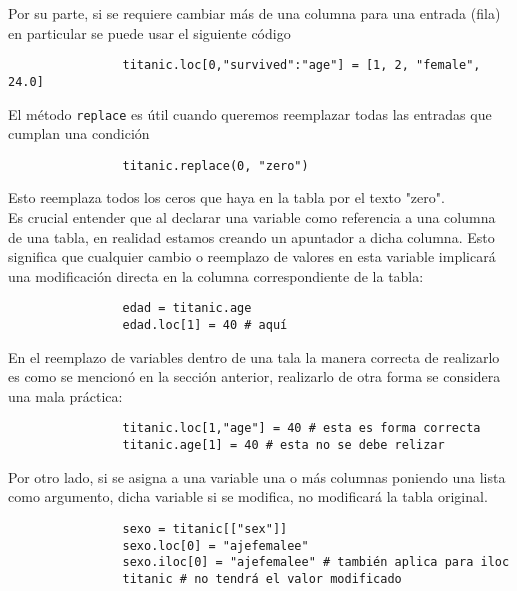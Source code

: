             \noindent Por su parte, si se requiere cambiar más de una columna para una entrada (fila) en particular se puede usar el siguiente código

            \begin{verbatim}
                titanic.loc[0,"survived":"age"] = [1, 2, "female", 24.0]
            \end{verbatim}

            \noindent El método \texttt{replace} es útil cuando queremos reemplazar todas las entradas que cumplan una condición

            \begin{verbatim}
                titanic.replace(0, "zero")
            \end{verbatim}

            \noindent Esto reemplaza todos los ceros que haya en la tabla por el texto "zero". \\

            \noindent Es crucial entender que al declarar una variable como referencia a una columna de una tabla, en realidad estamos creando un apuntador a dicha columna. Esto significa que cualquier cambio o reemplazo de valores en esta variable implicará una modificación directa en la columna correspondiente de la tabla:

            \begin{verbatim}
                edad = titanic.age
                edad.loc[1] = 40 # aquí
            \end{verbatim}

            \noindent En el reemplazo de variables dentro de una tala la manera correcta de realizarlo es como se mencionó en la sección anterior, realizarlo de otra forma se considera una mala práctica:

            \begin{verbatim}
                titanic.loc[1,"age"] = 40 # esta es forma correcta
                titanic.age[1] = 40 # esta no se debe relizar
            \end{verbatim}

            \noindent Por otro lado, si se asigna a una variable una o más columnas poniendo una lista como argumento, dicha variable si se modifica, no modificará la tabla original.

            \begin{verbatim}
                sexo = titanic[["sex"]]
                sexo.loc[0] = "ajefemalee"
                sexo.iloc[0] = "ajefemalee" # también aplica para iloc
                titanic # no tendrá el valor modificado
            \end{verbatim}
            
